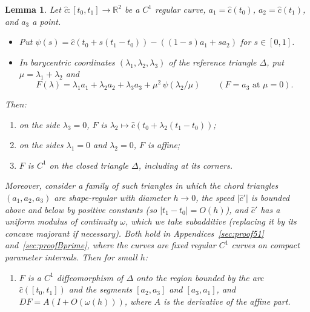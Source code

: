 \documentclass[preprint,12pt]{elsarticle}
\newtheorem{lemma}[theorem]{Lemma}
\theoremstyle{definition}
\theoremstyle{remark}
\newcommand{\R}{\mathbb{R}}
\begin{document}
\begin{lemma}\label{lem:curvedtri}
Let $\hat c\colon[t_0,t_1]\to\R^2$ be a $C^1$ regular curve, $a_1=\hat c(t_0)$, $a_2=\hat c(t_1)$, and $a_3$ a point.
\begin{itemize}
\item Put $\psi(s)=\hat c(t_0+s(t_1-t_0))-((1-s)a_1+sa_2)$ for $s\in[0,1]$.
\item In barycentric coordinates $(\lambda_1,\lambda_2,\lambda_3)$ of the reference triangle $\Delta$, put
$\mu=\lambda_1+\lambda_2$ and
\[
F(\lambda)=\lambda_1a_1+\lambda_2a_2+\lambda_3a_3+\mu^2\,\psi(\lambda_2/\mu)\qquad(F=a_3\text{ at }\mu=0).
\]
\end{itemize}
Then:
\begin{enumerate}
\item[(a)] on the side $\lambda_3=0$, $F$ is $\lambda_2\mapsto\hat c(t_0+\lambda_2(t_1-t_0))$;
\item[(b)] on the sides $\lambda_1=0$ and $\lambda_2=0$, $F$ is affine;
\item[(c)] $F$ is $C^1$ on the closed triangle $\Delta$, including at its corners.
\end{enumerate}
Moreover, consider a family of such triangles in which the chord triangles $(a_1,a_2,a_3)$ are shape-regular with
diameter $h\to0$, the speed $|\hat c'|$ is bounded above and below by positive constants (so $|t_1-t_0|=O(h)$), and
$\hat c'$ has a uniform modulus of continuity $\omega$, which we take subadditive (replacing it by its concave majorant
if necessary). Both hold in Appendices~\ref{sec:proof51} and~\ref{sec:proofBprime}, where the curves are fixed regular
$C^1$ curves on compact parameter intervals. Then for small $h$:
\begin{enumerate}
\item[(d)] $F$ is a $C^1$ diffeomorphism of $\Delta$ onto the region bounded by the arc $\hat c([t_0,t_1])$ and the
segments $[a_2,a_3]$ and $[a_3,a_1]$, and $DF=A(I+O(\omega(h)))$, where $A$ is the derivative of the affine part.
\end{enumerate}
\end{lemma}
\end{document}
